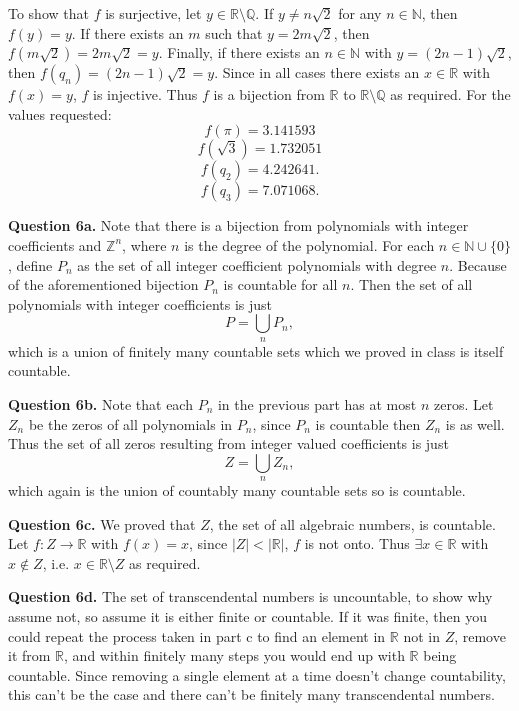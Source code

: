 \documentclass[letterpaper, reqno,11pt]{article}
\begin{document}
To show that $f$ is surjective, let $y\in \mathbb{R}\setminus \mathbb{Q}$. If $y\neq n\sqrt{2}$ for any $n\in \mathbb{N}$, then $f(y)=y$. If there exists an $m$ such that $y=2m\sqrt{2} $, then $f(m\sqrt{2})=2m\sqrt{2} =y$. Finally, if there exists an $n\in \mathbb{N}$ with $y=(2n-1)\sqrt{2} $, then $f(q_n)=(2n-1)\sqrt{2} =y$. Since in all cases there exists an $x\in \mathbb{R}$ with $f(x)=y$, $f$ is injective. Thus $f$ is a bijection from $\mathbb{R}$ to $\mathbb{R}\setminus \mathbb{Q}$ as required. For the values requested:
\[
f(\pi)=3.141593
\]
\[
f(\sqrt{3} )=1.732051
\]
\[
f(q_2)=4.242641
.\]
\[
f(q_3)=7.071068
.\]

\newpage

{\medskip\noindent\bf Question 6a.} Note that there is a bijection from polynomials with integer coefficients and $\mathbb{Z}^{n}$, where $n$ is the degree of the polynomial. For each $n\in \mathbb{N}\cup \{0\} $, define $P_n$ as the set of all integer coefficient polynomials with degree $n$. Because of the aforementioned bijection $P_n$ is countable for all $n$. Then the set of all polynomials with integer coefficients is just
\[
    P=\bigcup_{n} P_n
,\]
which is a union of finitely many countable sets which we proved in class is itself countable.

{\medskip\noindent\bf Question 6b.} Note that each $P_n$ in the previous part has at most $n$ zeros. Let $Z_n$ be the zeros of all polynomials in $P_n$, since $P_n$ is countable then $Z_n$ is as well. Thus the set of all zeros resulting from integer valued coefficients is just
\[
    Z=\bigcup_{n} Z_n
,\]
which again is the union of countably many countable sets so is countable.

{\medskip\noindent\bf Question 6c.} We proved that $Z$, the set of all algebraic numbers, is countable. Let $f:Z\to \mathbb{R}$ with $f(x)=x$, since $|Z|<|\mathbb{R}|$, $f$ is not onto. Thus $\exists x\in \mathbb{R}$ with $x\notin Z$, i.e. $x\in \mathbb{R}\setminus Z$ as required.

{\medskip\noindent\bf Question 6d.} The set of transcendental numbers is uncountable, to show why assume not, so assume it is either finite or countable. If it was finite, then you could repeat the process taken in part c to find an element in $\mathbb{R}$ not in $Z$, remove it from $\mathbb{R}$, and within finitely many steps you would end up with $\mathbb{R}$ being countable. Since removing a single element at a time doesn't change countability, this can't be the case and there can't be finitely many transcendental numbers.
\end{document}
